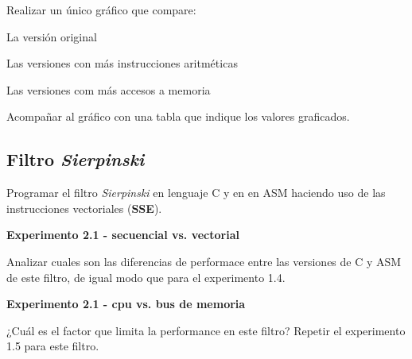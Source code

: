 Realizar un único gráfico que compare:
\begin{inparaenum}
    \item La versión original
    \item Las versiones con más instrucciones aritméticas
    \item Las versiones com más accesos a memoria
\end{inparaenum}

Acompañar al gráfico con una tabla que indique los valores graficados.  
  
%
%
%	


\subsection{Filtro \textit{Sierpinski}}

Programar el filtro \textit{Sierpinski} en lenguaje C y en en ASM haciendo 
uso de las instrucciones vectoriales (\textbf{SSE}).

\vspace*{0.3cm} \noindent
\textbf{Experimento 2.1 - secuencial vs. vectorial}

Analizar cuales son las diferencias de performace entre las versiones de C 
y ASM de este filtro, de igual modo que para el experimento 1.4.

\vspace*{0.3cm} \noindent
\textbf{Experimento 2.1 - cpu vs. bus de memoria}

¿Cuál es el factor que limita la performance en este filtro?
Repetir el experimento 1.5 para este filtro.

